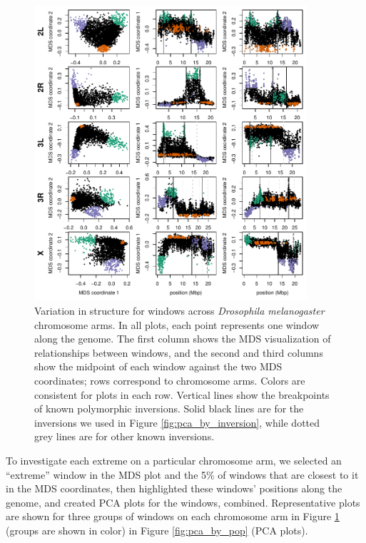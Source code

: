 \documentclass[11pt, oneside]{article}   	%
\begin{document}
\begin{figure}
    \begin{center}
       \includegraphics[width=0.9\textwidth]{Fig1_allchr_Together_MDS_plot_compact_with_ChrX_inv}
    \end{center}
    \caption{
        Variation in structure for windows across \textit{Drosophila melanogaster} chromosome arms.
        In all plots, each point represents one window along the genome.
         The first column shows the MDS visualization of relationships between windows, 
         and the second and third columns show the midpoint of each window against the two MDS coordinates; 
         rows correspond to chromosome arms.
         Colors are consistent for plots in each row. 
         Vertical lines show the breakpoints of known polymorphic inversions.   
         Solid black lines are for the inversions we used in Figure \ref{fig:pca_by_inversion},
         while dotted grey lines are for other known inversions.     
         \label{fig:mds_allchr}
    }
\end{figure}


To investigate each extreme on a particular chromosome arm, 
we selected an ``extreme'' window in the MDS plot
and the 5\% of windows that are closest to it in the MDS coordinates,
then highlighted these windows' positions along the genome,
and created PCA plots for the windows, combined.
Representative plots are shown for three groups of windows on each chromosome arm
in Figure \ref{fig:mds_allchr} (groups are shown in color)
in Figure \ref{fig:pca_by_pop} (PCA plots).
\end{document}
